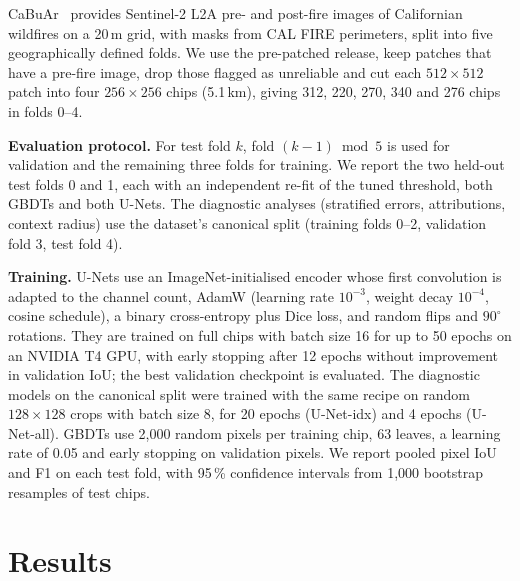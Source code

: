 \documentclass[conference]{IEEEtran}
\begin{document}
CaBuAr~\cite{cambrin2023cabuar} provides Sentinel-2 L2A pre- and post-fire images of Californian wildfires on a 20\,m grid, with masks from CAL FIRE perimeters, split into five geographically defined folds. We use the pre-patched release, keep patches that have a pre-fire image, drop those flagged as unreliable and cut each $512\times512$ patch into four $256\times256$ chips (5.1\,km), giving 312, 220, 270, 340 and 276 chips in folds 0--4.

\textbf{Evaluation protocol.} For test fold $k$, fold $(k-1)\bmod 5$ is used for validation and the remaining three folds for training. We report the two held-out test folds 0 and 1, each with an independent re-fit of the tuned threshold, both GBDTs and both U-Nets. The diagnostic analyses (stratified errors, attributions, context radius) use the dataset's canonical split (training folds 0--2, validation fold 3, test fold 4).

\textbf{Training.} U-Nets use an ImageNet-initialised encoder whose first convolution is adapted to the channel count, AdamW (learning rate $10^{-3}$, weight decay $10^{-4}$, cosine schedule), a binary cross-entropy plus Dice loss, and random flips and $90^\circ$ rotations. They are trained on full chips with batch size 16 for up to 50 epochs on an NVIDIA T4 GPU, with early stopping after 12 epochs without improvement in validation IoU; the best validation checkpoint is evaluated. The diagnostic models on the canonical split were trained with the same recipe on random $128\times128$ crops with batch size 8, for 20 epochs (U-Net-idx) and 4 epochs (U-Net-all). GBDTs use 2{,}000 random pixels per training chip, 63 leaves, a learning rate of 0.05 and early stopping on validation pixels. We report pooled pixel IoU and F1 on each test fold, with 95\,\% confidence intervals from 1{,}000 bootstrap resamples of test chips.

\section{Results}\label{sec:results}
\end{document}
